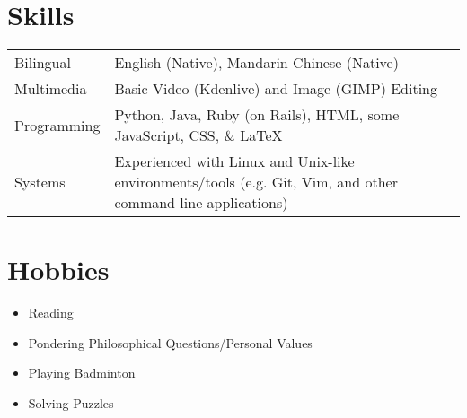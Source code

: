 \documentclass[letter, 12pt]{article}
\begin{document}
\section{Skills}

\begin{tabularx}{\linewidth}{@{}l X@{}}
    Bilingual &  English (Native), Mandarin Chinese (Native) \\
    Multimedia & Basic Video (Kdenlive) and Image (GIMP) Editing \\
    Programming & Python, Java, Ruby (on Rails), HTML, some JavaScript, CSS, \& \LaTeX \\
    Systems & Experienced with Linux and Unix-like environments/tools (e.g. Git, Vim, and other command line applications) \\
\end{tabularx}

\section{Hobbies}

\begin{itemize}
    \item Reading
    \item Pondering Philosophical Questions/Personal Values
    \item Playing Badminton
    \item Solving Puzzles
\end{itemize}

\vfill
{}
\end{document}

